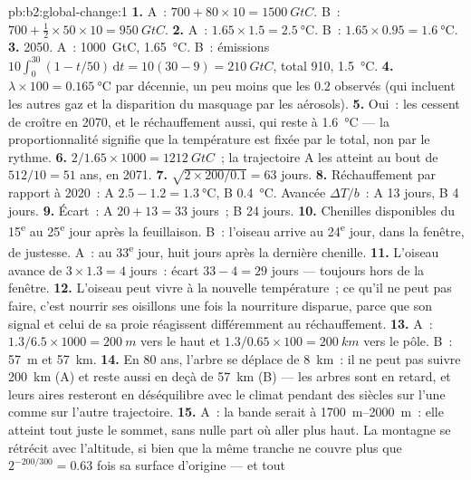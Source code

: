 \begin{solution}{pb:b2:global-change:1}
\textbf{1.} A~: $700 + 80\times 10 = \qty{1500}{GtC}$. B~: $700 +
\tfrac12\times 50\times 10 = \qty{950}{GtC}$.
\textbf{2.} A~: $1.65\times 1.5 = \qty{2.5}{\celsius}$. B~:
$1.65\times 0.95 = \qty{1.6}{\celsius}$.
\textbf{3.} 2050. A~: \qty{1000}{GtC}, \qty{1.65}{\celsius}. B~:
émissions $10\int_0^{30}(1 - t/50)\,\mathrm{d}t = 10(30 - 9) =
\qty{210}{GtC}$, total 910, \qty{1.5}{\celsius}.
\textbf{4.} $\lambda\times 100 = \qty{0.165}{\celsius}$ par décennie,
un peu moins que les $0.2$ observés (qui incluent les autres gaz et la
disparition du masquage par les aérosols).
\textbf{5.} Oui~: les  cessent de croître en 2070, et le
réchauffement aussi, qui reste à \qty{1.6}{\celsius} --- la
proportionnalité signifie que la température est fixée par le total, non
par le rythme.
\textbf{6.} $2/1.65\times 1000 = \qty{1212}{GtC}$~; la trajectoire A les
atteint au bout de $512/10 = 51$ ans, en 2071.
\textbf{7.} $\sqrt{2\times 200/0.1} = 63$ jours.
\textbf{8.} Réchauffement par rapport à 2020~: A $2.5 - 1.2 =
\qty{1.3}{\celsius}$, B \qty{0.4}{\celsius}. Avancée $\Delta T/b$~:
A 13 jours, B 4 jours.
\textbf{9.} Écart~: A $20 + 13 = 33$ jours~; B 24 jours.
\textbf{10.} Chenilles disponibles du 15\textsuperscript{e} au
25\textsuperscript{e} jour après la feuillaison. B~: l'oiseau arrive au
24\textsuperscript{e} jour, dans la fenêtre, de justesse. A~: au
33\textsuperscript{e} jour, huit jours après la dernière chenille.
\textbf{11.} L'oiseau avance de $3\times 1.3 = 4$ jours~: écart $33 - 4 =
29$ jours --- toujours hors de la fenêtre.
\textbf{12.} L'oiseau peut vivre à la nouvelle température~; ce qu'il ne
peut pas faire, c'est nourrir ses oisillons une fois la nourriture
disparue, parce que son signal et celui de sa proie réagissent
différemment au réchauffement.
\textbf{13.} A~: $1.3/6.5\times 1000 = \qty{200}{m}$ vers le haut et
$1.3/0.65\times 100 = \qty{200}{km}$ vers le pôle. B~: \qty{57}{m} et
\qty{57}{km}.
\textbf{14.} En 80 ans, l'arbre se déplace de \qty{8}{km}~: il ne peut
pas suivre \qty{200}{km} (A) et reste aussi en deçà de \qty{57}{km} (B)
--- les arbres sont en retard, et leurs aires resteront en déséquilibre
avec le climat pendant des siècles sur l'une comme sur l'autre
trajectoire.
\textbf{15.} A~: la bande serait à \qtyrange{1700}{2000}{m}~: elle atteint
tout juste le sommet, sans nulle part où aller plus haut. La montagne se
rétrécit avec l'altitude, si bien que la même tranche ne couvre plus que
$2^{-200/300} = 0.63$ fois sa surface d'origine --- et tout

\end{solution}
